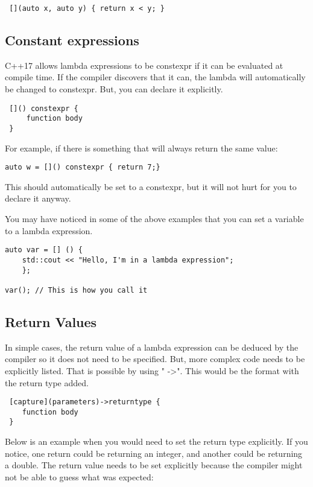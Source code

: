 \begin{lstlisting}
 [](auto x, auto y) { return x < y; }    
\end{lstlisting}

\subsection{Constant expressions}
C++17 allows lambda expressions to be constexpr if it can be evaluated at compile time. If the compiler discovers that it can, the lambda will automatically be changed to constexpr. But, you can declare it explicitly.

\begin{verbatim}
 []() constexpr {
     function body
 }    
\end{verbatim}
For example, if there is something that will always return the same value:
\begin{lstlisting}
auto w = []() constexpr { return 7;}
\end{lstlisting}
This should automatically be set to a constexpr, but it will not hurt for you
to declare it anyway.


You may have noticed in some of the above examples that you can set a variable to a lambda expression. 

\begin{lstlisting}
auto var = [] () { 
    std::cout << "Hello, I'm in a lambda expression"; 
    };
    
var(); // This is how you call it
\end{lstlisting}

\subsection{Return Values}
In simple cases, the return value of a lambda expression can be deduced by the compiler so it does not need to be specified. But, more complex code needs to be explicitly listed. That is possible by using " -\textgreater ". This would be the format with the return type added.

\begin{verbatim}
 [capture](parameters)->returntype {
    function body
 }    
\end{verbatim}
Below is an example when you would need to set the return type explicitly. If you notice,
one return could be returning an integer, and another could be returning a double. The return value needs to be set explicitly because the compiler might not be able to guess what was expected:

